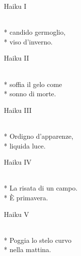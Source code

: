 \documentclass[12pt]{book}
\begin{document}
\begin{poem}{Haiku I}{}

\settowidth{\versewidth}{non meno è ciò che meriti.}

\begin{altverse}
\\*
candido germoglio,\\*
viso d'inverno.
\end{altverse}

\end{poem}

\begin{poem}{Haiku II}{}

\settowidth{\versewidth}{non meno è ciò che meriti.}

\begin{altverse}
\\*
soffia il gelo come\\*
sonno di morte.
\end{altverse}


\end{poem}

\begin{poem}{Haiku III}{}

\settowidth{\versewidth}{non meno è ciò che meriti.}

\begin{altverse}
\\*
Ordigno d'apparenze, \\*
liquida luce.
\end{altverse}


\end{poem}

\begin{poem}{Haiku IV}{}

\settowidth{\versewidth}{non meno è ciò che meriti.}

\begin{altverse}
\\*
La risata di un campo.\\*
È primavera.
\end{altverse}


\end{poem}

\begin{poem}{Haiku V}{}

\settowidth{\versewidth}{non meno è ciò che meriti.}

\begin{altverse}
\\*
Poggia lo stelo curvo\\*
nella mattina.
\end{altverse}


\end{poem}
\end{document}
